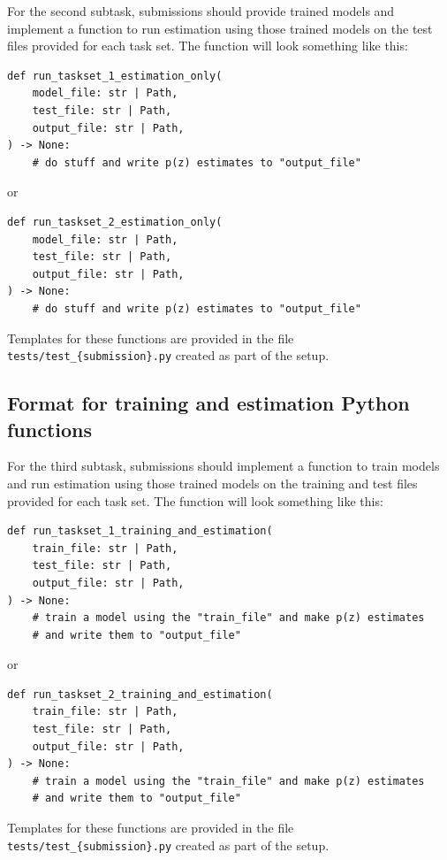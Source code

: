 For the second subtask, submissions should provide trained models and
implement a function to run estimation using those trained models on
the test files provided for each task set. The function will look something like this:

\begin{verbatim}
def run_taskset_1_estimation_only(
    model_file: str | Path,
    test_file: str | Path,
    output_file: str | Path,
) -> None:
    # do stuff and write p(z) estimates to "output_file"
\end{verbatim}

or

\begin{verbatim}
def run_taskset_2_estimation_only(
    model_file: str | Path,
    test_file: str | Path,
    output_file: str | Path,
) -> None:
    # do stuff and write p(z) estimates to "output_file"
\end{verbatim}

Templates for these functions are provided in the file
\texttt{tests/test\_\{submission\}.py} created as part of the setup.


\subsection{Format for training and estimation Python functions}

For the third subtask, submissions should implement a function to
train models and run estimation using those trained models on the
training and test files provided for each task set. The function will
look something like this:

\begin{verbatim}
def run_taskset_1_training_and_estimation(
    train_file: str | Path,
    test_file: str | Path,
    output_file: str | Path,
) -> None:
    # train a model using the "train_file" and make p(z) estimates 
    # and write them to "output_file"
\end{verbatim}

or

\begin{verbatim}
def run_taskset_2_training_and_estimation(
    train_file: str | Path,
    test_file: str | Path,
    output_file: str | Path,
) -> None:
    # train a model using the "train_file" and make p(z) estimates
    # and write them to "output_file"
\end{verbatim}

Templates for these functions are provided in the file
\texttt{tests/test\_\{submission\}.py} created as part of the setup.


